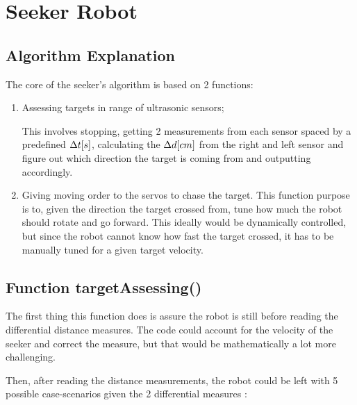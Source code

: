 \documentclass{report}
\begin{document}
\section{Seeker Robot}


\subsection{Algorithm Explanation}

The core of the seeker's algorithm is based on 2 functions:
\begin{enumerate}
      \item Assessing targets in range of ultrasonic sensors;
      
      This involves stopping, getting 2 measurements from each sensor spaced by
      a predefined $\Delta t\space[s]$, calculating the $\Delta d\space[cm]$ from the right and
      left sensor and figure out which direction the target is coming from and
      outputting accordingly.
      \item Giving moving order to the servos to chase the target. This function
      purpose is to, given the direction the target crossed from, tune how much
      the robot should rotate and go forward. This ideally would be dynamically
      controlled, but since the robot cannot know how fast the target crossed,
      it has to be manually tuned for a given target velocity.
\end{enumerate}

\subsection{Function targetAssessing()}

The first thing this function does is assure the robot is still before reading
the differential distance measures. The code could account for the velocity of
the seeker and correct the measure, but that would be mathematically a lot more
challenging.

Then, after reading the distance measurements, the robot could be left with 5
possible case-scenarios given the 2 differential measures :
\end{document}
